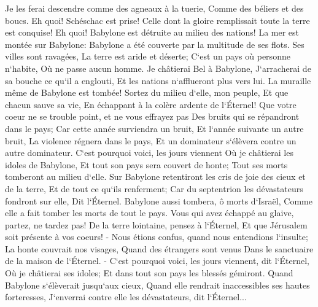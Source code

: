\verse Je les ferai descendre comme des agneaux à la tuerie, Comme des béliers et des boucs. 
\verse Eh quoi! Schéschac est prise! Celle dont la gloire remplissait toute la terre est conquise! Eh quoi! Babylone est détruite au milieu des nations! 
\verse La mer est montée sur Babylone: Babylone a été couverte par la multitude de ses flots. 
\verse Ses villes sont ravagées, La terre est aride et déserte; C`est un pays où personne n`habite, Où ne passe aucun homme. 
\verse Je châtierai Bel à Babylone, J`arracherai de sa bouche ce qu`il a englouti, Et les nations n`afflueront plus vers lui. La muraille même de Babylone est tombée! 
\verse Sortez du milieu d`elle, mon peuple, Et que chacun sauve sa vie, En échappant à la colère ardente de l`Éternel! 
\verse Que votre coeur ne se trouble point, et ne vous effrayez pas Des bruits qui se répandront dans le pays; Car cette année surviendra un bruit, Et l`année suivante un autre bruit, La violence régnera dans le pays, Et un dominateur s`élèvera contre un autre dominateur. 
\verse C`est pourquoi voici, les jours viennent Où je châtierai les idoles de Babylone, Et tout son pays sera couvert de honte; Tout ses morts tomberont au milieu d`elle. 
\verse Sur Babylone retentiront les cris de joie des cieux et de la terre, Et de tout ce qu`ils renferment; Car du septentrion les dévastateurs fondront sur elle, Dit l`Éternel. 
\verse Babylone aussi tombera, ô morts d`Israël, Comme elle a fait tomber les morts de tout le pays. 
\verse Vous qui avez échappé au glaive, partez, ne tardez pas! De la terre lointaine, pensez à l`Éternel, Et que Jérusalem soit présente à vos coeurs! - 
\verse Nous étions confus, quand nous entendions l`insulte; La honte couvrait nos visages, Quand des étrangers sont venus Dans le sanctuaire de la maison de l`Éternel. - 
\verse C`est pourquoi voici, les jours viennent, dit l`Éternel, Où je châtierai ses idoles; Et dans tout son pays les blessés gémiront. 
\verse Quand Babylone s`élèverait jusqu`aux cieux, Quand elle rendrait inaccessibles ses hautes forteresses, J`enverrai contre elle les dévastateurs, dit l`Éternel... 
